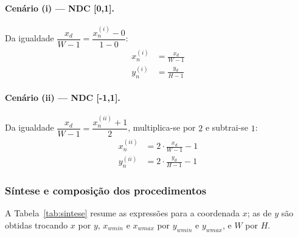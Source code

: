 \paragraph{Cenário (i) --- NDC [0,1].} Da igualdade $\dfrac{x_d}{W-1} = \dfrac{x_n^{(i)} - 0}{1 - 0}$:
\begin{equation}
    \boxed{\begin{aligned}
        x_n^{(i)} &= \frac{x_d}{W-1} \\[2mm]
        y_n^{(i)} &= \frac{y_d}{H-1}
    \end{aligned}}
    \label{eq:dc-ndc-i}
\end{equation}

\paragraph{Cenário (ii) --- NDC [-1,1].} Da igualdade $\dfrac{x_d}{W-1} = \dfrac{x_n^{(ii)} + 1}{2}$, multiplica-se por $2$ e subtrai-se $1$:
\begin{equation}
    \boxed{\begin{aligned}
        x_n^{(ii)} &= 2 \cdot \frac{x_d}{W-1} - 1 \\[2mm]
        y_n^{(ii)} &= 2 \cdot \frac{y_d}{H-1} - 1
    \end{aligned}}
    \label{eq:dc-ndc-ii}
\end{equation}

\subsubsection{Síntese e composição dos procedimentos}
\label{subsec:sintese}
A Tabela~\ref{tab:sintese} resume as expressões para a coordenada $x$; as de $y$ são obtidas trocando $x$ por $y$, $x_{wmin}$ e $x_{wmax}$ por $y_{wmin}$ e $y_{wmax}$, e $W$ por $H$.

